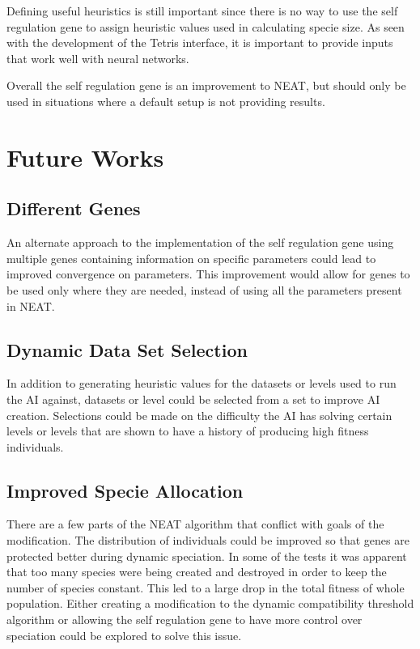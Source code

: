 \documentclass[12pt]{ucthesis} \newif\ifpdf \ifx\pdfoutput\undefined
\begin{document}
Defining useful heuristics is still important since there is no way to use the
self regulation gene to assign heuristic values used in calculating specie size.
As seen with the development of the Tetris interface, it is important to provide
inputs that work well with neural networks.

Overall the self regulation gene is an improvement to NEAT, but should only be
used in situations where a default setup is not providing results.

\section{Future Works}

\subsection{Different Genes}

An alternate approach to the implementation of the self regulation gene using
multiple genes containing information on specific parameters could lead to
improved convergence on parameters. This improvement would allow for genes to be
used only where they are needed, instead of using all the parameters present in
NEAT.
\subsection{Dynamic Data Set Selection}

In addition to generating heuristic values for the datasets or levels used to
run the AI against, datasets or level could be selected from a set to improve
AI creation. Selections could be made on  the difficulty the AI has solving certain
levels or levels that are shown to have a history of producing high fitness
individuals.
\subsection{Improved Specie Allocation}

There are a few parts of the NEAT algorithm that conflict with goals of the
modification. The distribution of individuals could be improved so that genes
are protected better during dynamic speciation. In some of the tests it was
apparent that too many species were being created and destroyed in order to keep
the number of species constant. This led to a large drop in the total fitness of
whole population. Either creating a modification to the dynamic compatibility
threshold algorithm or allowing the self regulation gene to have more control
over speciation could be explored to solve this issue.
\end{document}
